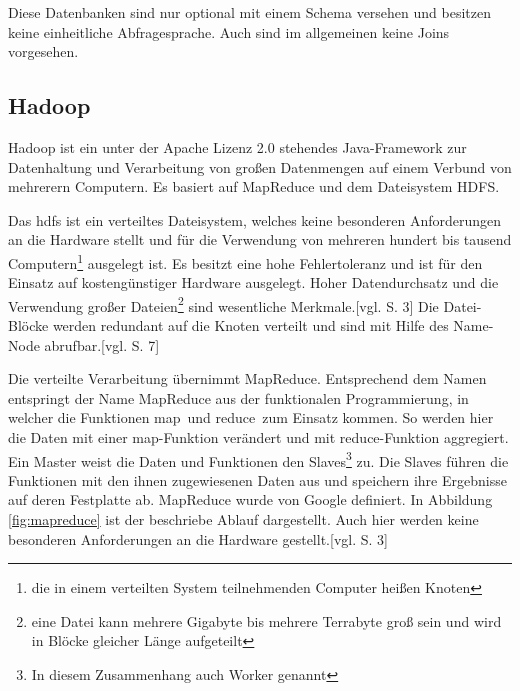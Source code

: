 Diese Datenbanken sind nur optional mit einem Schema versehen und besitzen keine einheitliche Abfragesprache.
Auch sind im allgemeinen keine Joins vorgesehen.


\subsection{Hadoop}
\label{hadoop}

Hadoop ist ein unter der Apache Lizenz 2.0 stehendes Java-Framework zur Datenhaltung und Verarbeitung von großen Datenmengen auf einem Verbund von mehrerern Computern.
Es basiert auf MapReduce und dem Dateisystem HDFS.

Das \Gls{hdfs} ist ein verteiltes Dateisystem, welches keine besonderen Anforderungen an die Hardware stellt und für die Verwendung von mehreren hundert bis tausend Computern\footnote{die in einem verteilten System teilnehmenden Computer heißen Knoten} ausgelegt ist.
Es besitzt eine hohe Fehlertoleranz und ist für den Einsatz auf kostengünstiger Hardware ausgelegt.
Hoher Datendurchsatz und die Verwendung großer Dateien\footnote{eine Datei kann mehrere Gigabyte bis mehrere Terrabyte groß sein und wird in Blöcke gleicher Länge aufgeteilt} sind wesentliche Merkmale.[vgl. \cite{paper:hadoop} S. 3]
Die Datei-Blöcke werden redundant auf die Knoten verteilt und sind mit Hilfe des Name-Node abrufbar.[vgl. \cite{ba:dan} S. 7]

Die verteilte Verarbeitung übernimmt MapReduce.
Entsprechend dem Namen entspringt der Name MapReduce aus der funktionalen Programmierung, in welcher die Funktionen \glqq map\grqq \ und \glqq reduce\grqq \ zum Einsatz kommen.
So werden hier die Daten mit einer map-Funktion verändert und mit reduce-Funktion aggregiert.
Ein Master weist die Daten und Funktionen den Slaves\footnote{In diesem Zusammenhang auch Worker genannt} zu.
Die Slaves führen die Funktionen mit den ihnen zugewiesenen Daten aus und speichern ihre Ergebnisse auf deren Festplatte ab.
MapReduce wurde von Google definiert.
In Abbildung \ref{fig:mapreduce} ist der beschriebe Ablauf dargestellt.
Auch hier werden keine besonderen Anforderungen an die Hardware gestellt.[vgl. \cite{paper:mapreduce} S. 3]

